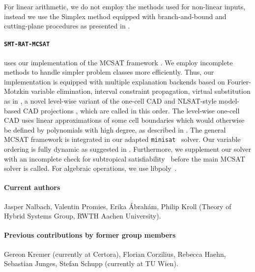 \documentclass{article}
\begin{document}
For linear arithmetic, we do not employ the methods used for non-linear inputs, instead we use the Simplex method equipped with branch-and-bound and cutting-plane procedures as presented in \cite{DM06}.
\fi

\paragraph{\texttt{SMT-RAT-MCSAT}} uses our implementation of the MCSAT framework \cite{Moura2013}.
We employ incomplete methods to handle simpler problem classes more efficiently.
Thus, our implementation is equipped with multiple explanation backends based on Fourier-Motzkin variable elimination, interval constraint propagation, virtual substitution as in \cite{Abraham2017}, a novel level-wise variant of the one-cell CAD \cite{brown2015constructing,nalbach2022levelwise} and NLSAT-style model-based CAD projections \cite{jovanovic2012solving}, which are called in this order.
The level-wise one-cell CAD uses linear approximations of some cell boundaries which would otherwise be defined by polynomials with high degree, as described in \cite{promies_msc}.
The general MCSAT framework is integrated in our adapted \texttt{minisat}~\cite{Een2003} solver.
Our variable ordering is fully dynamic as suggested in \cite{Jovanovic2013}.
Furthermore, we supplement our solver with an incomplete check for subtropical satisfiability~\cite{Fontaine2017} before the main MCSAT solver is called.
For algebraic operations, we use libpoly~\cite{libpoly}.


\paragraph{Current authors}
Jasper Nalbach, Valentin Promies, Erika \'Abrah\'am, Philip Kroll
(Theory of Hybrid Systems Group, RWTH Aachen University).

\paragraph{Previous contributions by former group members}
Gereon Kremer (currently at Certora),
Florian Corzilius,
Rebecca Haehn,
Sebastian Junges,
Stefan Schupp (currently at TU Wien).




\end{document}
